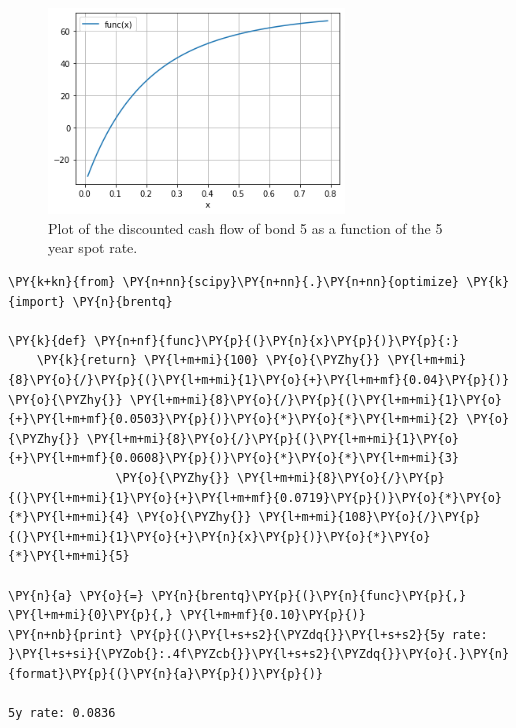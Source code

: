 \begin{figure}[htb]
  \centering
  \includegraphics[width=0.7\textwidth]{lesson3_files/lesson3_13_0.png}
  \caption{Plot of the discounted cash flow of bond 5 as a function of the 5 year spot rate.}
  \label{fig:fifth_year_rate}
\end{figure}

\begin{tcolorbox}[breakable, size=fbox, boxrule=1pt, pad at break*=1mm,colback=cellbackground, colframe=cellborder]
\begin{Verbatim}[commandchars=\\\{\}]
\PY{k+kn}{from} \PY{n+nn}{scipy}\PY{n+nn}{.}\PY{n+nn}{optimize} \PY{k}{import} \PY{n}{brentq}

\PY{k}{def} \PY{n+nf}{func}\PY{p}{(}\PY{n}{x}\PY{p}{)}\PY{p}{:}
    \PY{k}{return} \PY{l+m+mi}{100} \PY{o}{\PYZhy{}} \PY{l+m+mi}{8}\PY{o}{/}\PY{p}{(}\PY{l+m+mi}{1}\PY{o}{+}\PY{l+m+mf}{0.04}\PY{p}{)} \PY{o}{\PYZhy{}} \PY{l+m+mi}{8}\PY{o}{/}\PY{p}{(}\PY{l+m+mi}{1}\PY{o}{+}\PY{l+m+mf}{0.0503}\PY{p}{)}\PY{o}{*}\PY{o}{*}\PY{l+m+mi}{2} \PY{o}{\PYZhy{}} \PY{l+m+mi}{8}\PY{o}{/}\PY{p}{(}\PY{l+m+mi}{1}\PY{o}{+}\PY{l+m+mf}{0.0608}\PY{p}{)}\PY{o}{*}\PY{o}{*}\PY{l+m+mi}{3} 
               \PY{o}{\PYZhy{}} \PY{l+m+mi}{8}\PY{o}{/}\PY{p}{(}\PY{l+m+mi}{1}\PY{o}{+}\PY{l+m+mf}{0.0719}\PY{p}{)}\PY{o}{*}\PY{o}{*}\PY{l+m+mi}{4} \PY{o}{\PYZhy{}} \PY{l+m+mi}{108}\PY{o}{/}\PY{p}{(}\PY{l+m+mi}{1}\PY{o}{+}\PY{n}{x}\PY{p}{)}\PY{o}{*}\PY{o}{*}\PY{l+m+mi}{5}

\PY{n}{a} \PY{o}{=} \PY{n}{brentq}\PY{p}{(}\PY{n}{func}\PY{p}{,} \PY{l+m+mi}{0}\PY{p}{,} \PY{l+m+mf}{0.10}\PY{p}{)}
\PY{n+nb}{print} \PY{p}{(}\PY{l+s+s2}{\PYZdq{}}\PY{l+s+s2}{5y rate: }\PY{l+s+si}{\PYZob{}:.4f\PYZcb{}}\PY{l+s+s2}{\PYZdq{}}\PY{o}{.}\PY{n}{format}\PY{p}{(}\PY{n}{a}\PY{p}{)}\PY{p}{)}

5y rate: 0.0836
\end{Verbatim}
\end{tcolorbox}

